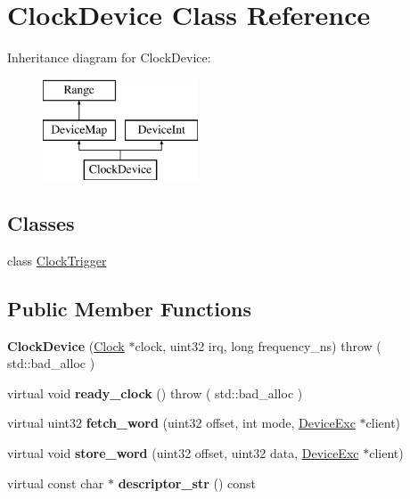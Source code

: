 \hypertarget{classClockDevice}{
\section{ClockDevice Class Reference}
\label{classClockDevice}
}
Inheritance diagram for ClockDevice:\begin{figure}[H]
\begin{center}
\leavevmode
\includegraphics[height=3cm]{classClockDevice}
\end{center}
\end{figure}
\subsection*{Classes}
\begin{DoxyCompactItemize}
\item 
class \hyperlink{classClockDevice_1_1ClockTrigger}{ClockTrigger}
\end{DoxyCompactItemize}
\subsection*{Public Member Functions}
\begin{DoxyCompactItemize}
\item 
\hypertarget{classClockDevice_aba00ae8b6155e4b9e8570b8cbec432b6}{
{\bfseries ClockDevice} (\hyperlink{classClock}{Clock} $\ast$clock, uint32 irq, long frequency\_\-ns)  throw ( std::bad\_\-alloc )}
\label{classClockDevice_aba00ae8b6155e4b9e8570b8cbec432b6}

\item 
\hypertarget{classClockDevice_ac837bd6024524e14733fef9a3caf20bd}{
virtual void {\bfseries ready\_\-clock} ()  throw ( std::bad\_\-alloc )}
\label{classClockDevice_ac837bd6024524e14733fef9a3caf20bd}

\item 
\hypertarget{classClockDevice_a8fac0caef40e255d93162bdd0e2b0a63}{
virtual uint32 {\bfseries fetch\_\-word} (uint32 offset, int mode, \hyperlink{classDeviceExc}{DeviceExc} $\ast$client)}
\label{classClockDevice_a8fac0caef40e255d93162bdd0e2b0a63}

\item 
\hypertarget{classClockDevice_a87082836fc257de250ad4612ff50a281}{
virtual void {\bfseries store\_\-word} (uint32 offset, uint32 data, \hyperlink{classDeviceExc}{DeviceExc} $\ast$client)}
\label{classClockDevice_a87082836fc257de250ad4612ff50a281}

\item 
\hypertarget{classClockDevice_afb660217da1d9ce3142df8ffd04e6569}{
virtual const char $\ast$ {\bfseries descriptor\_\-str} () const }
\label{classClockDevice_afb660217da1d9ce3142df8ffd04e6569}

\end{DoxyCompactItemize}
